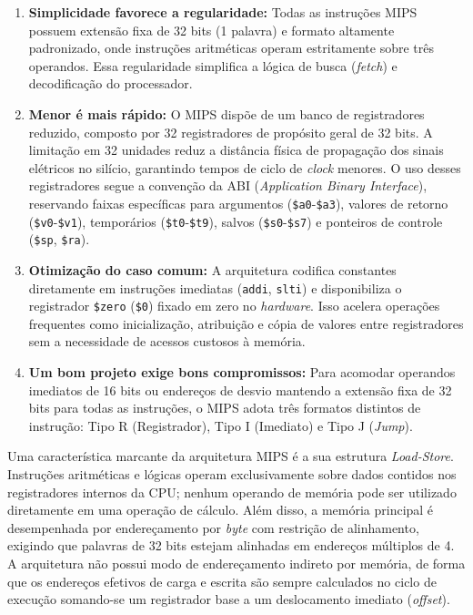 \begin{enumerate}
    \item \textbf{Simplicidade favorece a regularidade:} Todas as instruções MIPS possuem extensão fixa de 32 bits (1 palavra) e formato altamente padronizado, onde instruções aritméticas operam estritamente sobre três operandos. Essa regularidade simplifica a lógica de busca (\textit{fetch}) e decodificação do processador.
    
    \item \textbf{Menor é mais rápido:} O MIPS dispõe de um banco de registradores reduzido, composto por 32 registradores de propósito geral de 32 bits. A limitação em 32 unidades reduz a distância física de propagação dos sinais elétricos no silício, garantindo tempos de ciclo de \textit{clock} menores. O uso desses registradores segue a convenção da ABI (\textit{Application Binary Interface}), reservando faixas específicas para argumentos (\texttt{\$a0}-\texttt{\$a3}), valores de retorno (\texttt{\$v0}-\texttt{\$v1}), temporários (\texttt{\$t0}-\texttt{\$t9}), salvos (\texttt{\$s0}-\texttt{\$s7}) e ponteiros de controle (\texttt{\$sp}, \texttt{\$ra}).
    
    \item \textbf{Otimização do caso comum:} A arquitetura codifica constantes diretamente em instruções imediatas (\texttt{addi}, \texttt{slti}) e disponibiliza o registrador \texttt{\$zero} (\texttt{\$0}) fixado em zero no \textit{hardware}. Isso acelera operações frequentes como inicialização, atribuição e cópia de valores entre registradores sem a necessidade de acessos custosos à memória.
    
    \item \textbf{Um bom projeto exige bons compromissos:} Para acomodar operandos imediatos de 16 bits ou endereços de desvio mantendo a extensão fixa de 32 bits para todas as instruções, o MIPS adota três formatos distintos de instrução: Tipo R (Registrador), Tipo I (Imediato) e Tipo J (\textit{Jump}).
\end{enumerate}

Uma característica marcante da arquitetura MIPS é a sua estrutura \textit{Load-Store}. Instruções aritméticas e lógicas operam exclusivamente sobre dados contidos nos registradores internos da CPU; nenhum operando de memória pode ser utilizado diretamente em uma operação de cálculo. Além disso, a memória principal é desempenhada por endereçamento por \textit{byte} com restrição de alinhamento, exigindo que palavras de 32 bits estejam alinhadas em endereços múltiplos de 4. A arquitetura não possui modo de endereçamento indireto por memória, de forma que os endereços efetivos de carga e escrita são sempre calculados no ciclo de execução somando-se um registrador base a um deslocamento imediato (\textit{offset}).